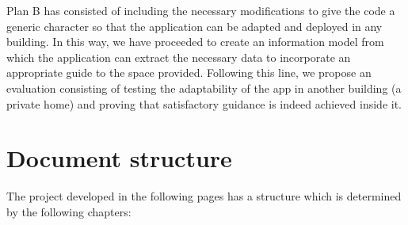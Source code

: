 Plan B has consisted of including the necessary modifications to give the code a generic character so that the application can be adapted and deployed in any building. In this way, we have proceeded to create an information model from which the application can extract the necessary data to incorporate an appropriate guide to the space provided. Following this line, we propose an evaluation consisting of testing the adaptability of the app in another building (a private home) and proving that satisfactory guidance is indeed achieved inside it.


\section{Document structure}
\label{sec:documEstruc}

The project developed in the following pages has a structure which is determined by the following chapters:

